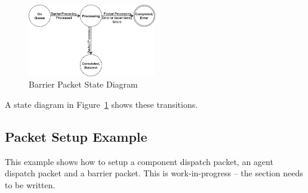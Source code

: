 \begin{figure}
  \centering
  \includegraphics[width=0.5\textwidth] {barrierpacketstate}
  \centering
  \caption{Barrier Packet State Diagram}
  \label{fig:barrierpacketstate}
\end{figure}

A state diagram in Figure~\ref{fig:barrierpacketstate} shows these
transitions.

\hypertarget{aql_example}{}\subsection{Packet Setup
Example}\label{aql_example}

This example shows how to setup a component dispatch packet, an
agent dispatch packet and a barrier packet. 
This is {\color{red} work-in-progress} -- the section needs to be written.

